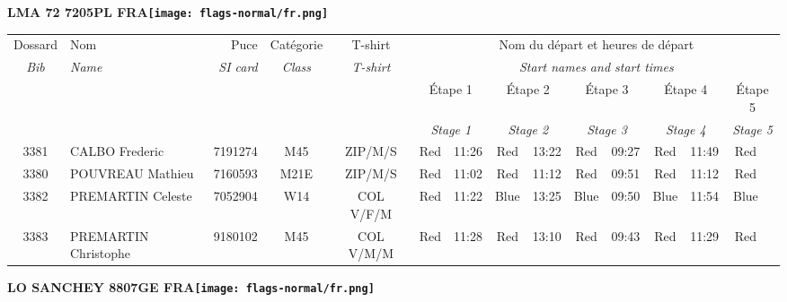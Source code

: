 \documentclass{report}
\begin{document}
\newpage
  \Huge \centering \bfseries LMA 72 7205PL FRA\normalfont \footnotesize \sffamily \hfill \texttt{[image: flags-normal/fr.png]} \newline 
  \begin{longtable}{|c|l|r|c|c|*{5}{cc|}}
    Dossard & Nom  & Puce    & Catégorie & T-shirt & \multicolumn{10}{c|}{Nom du départ et heures de départ} \\
    \itshape Bib     & \itshape Name & \itshape SI card & \itshape Class  & \itshape  T-shirt  & \multicolumn{10}{c|}{\itshape Start names and start times} \\
    \hline
    & & & & & \multicolumn{2}{c|}{Étape 1} & \multicolumn{2}{c|}{Étape 2} & \multicolumn{2}{c|}{Étape 3} & \multicolumn{2}{c|}{Étape 4} & \multicolumn{2}{c|}{Étape 5} \\
    & & & & & \multicolumn{2}{c|}{\itshape Stage 1} & \multicolumn{2}{c|}{\itshape Stage 2} & \multicolumn{2}{c|}{\itshape Stage 3} & \multicolumn{2}{c|}{\itshape Stage 4} & \multicolumn{2}{c|}{\itshape Stage 5} \\
    \hline
    3381 & CALBO Frederic & 7191274 & M45 & ZIP/M/S & Red & 11:26 & Red & 13:22 & Red & 09:27 & Red & 11:49 & Red &  \\
    3380 & POUVREAU Mathieu & 7160593 & M21E & ZIP/M/S & Red & 11:02 & Red & 11:12 & Red & 09:51 & Red & 11:12 & Red &  \\
    3382 & PREMARTIN Celeste & 7052904 & W14 & COL V/F/M & Red & 11:22 & Blue & 13:25 & Blue & 09:50 & Blue & 11:54 & Blue &  \\
    3383 & PREMARTIN Christophe & 9180102 & M45 & COL V/M/M & Red & 11:28 & Red & 13:10 & Red & 09:43 & Red & 11:29 & Red &  \\
  \end{longtable}
\newpage
  \Huge \centering \bfseries LO SANCHEY 8807GE FRA\normalfont \footnotesize \sffamily \hfill \texttt{[image: flags-normal/fr.png]} \newline 
\end{document}
